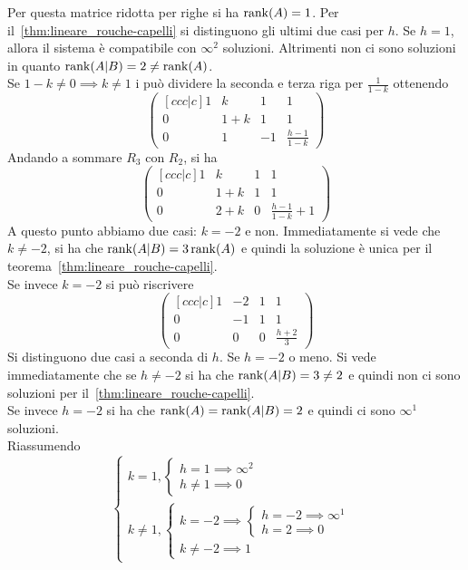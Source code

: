 Per questa matrice ridotta per righe si ha $\rank(A)=1$. Per
il~\autoref{thm:lineare_rouche-capelli} si distinguono gli ultimi due casi per $h$. Se
$h=1$, allora il sistema è compatibile con $\infty^2$ soluzioni. Altrimenti non ci sono
soluzioni in quanto $\rank(A\vert B) = 2 \neq \rank(A)$.\\
Se $1-k\neq0\implies k\neq1$ i può dividere la seconda e terza riga per $\frac{1}{1-k}$
ottenendo
\begin{equation*}
  \begin{pmatrix}[ccc|c]
    1 & k & 1 & 1\\
    0 & 1+k & 1 & 1\\
    0 & 1 & -1 & \frac{h-1}{1-k}
  \end{pmatrix}
\end{equation*}
Andando a sommare $R_3$ con $R_2$, si ha
\begin{equation*}
  \begin{pmatrix}[ccc|c]
    1 & k & 1 & 1\\
    0 & 1+k & 1 & 1\\
    0 & 2+k & 0 & \frac{h-1}{1-k}+1
  \end{pmatrix}
\end{equation*}
A questo punto abbiamo due casi: $k=-2$ e non. Immediatamente si vede che $k\neq-2$, si
ha che $\rank(A\vert B) = 3 \rank(A)$ e quindi la soluzione è unica per il
teorema~\autoref{thm:lineare_rouche-capelli}.\\
Se invece $k=-2$ si può riscrivere
\begin{equation*}
  \begin{pmatrix}[ccc|c]
    1 & -2 & 1 & 1\\
    0 & -1 & 1 & 1\\
    0 & 0 & 0 & \frac{h+2}{3}
  \end{pmatrix}
\end{equation*}
Si distinguono due casi a seconda di $h$. Se $h=-2$ o meno. Si vede immediatamente che
se $h\neq-2$ si ha che $\rank(A\vert B)=3\neq2$ e quindi non ci sono soluzioni per
il~\autoref{thm:lineare_rouche-capelli}.\\
Se invece $h=-2$ si ha che $\rank(A) = \rank(A\vert B) = 2$ e quindi ci sono $\infty^1$
soluzioni.\\
Riassumendo
\begin{equation*}
  \begin{cases}
    k=1,
    \begin{cases}
      h=1\implies\infty^2\\
      h\neq 1\implies 0
    \end{cases}\\
    k\neq1,
    \begin{cases}
      k=-2\implies
      \begin{cases}
        h=-2\implies\infty^1\\
        h=2\implies 0
      \end{cases}\\
      k\neq-2\implies 1
    \end{cases}
  \end{cases}
\end{equation*}

